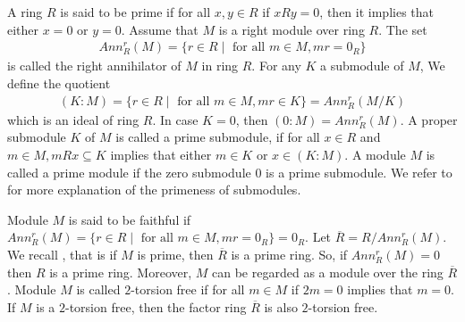 \documentclass{arxiv}
\begin{document}
A ring $R$ is said to be prime if for all $x,y \in R$ if $xRy=0$, then it implies that either $x=0$ or $y=0$. Assume that $M$ is a right module over ring $R$. The set 
\begin{align*}
    Ann_R^r(M)=\{r \in R \mid \text{ for all } m \in M, mr=0_R\}
\end{align*} 
is called the right annihilator of $M$ in ring $R$. For any $K$ a submodule of $M$, We define the quotient 
\begin{align*}
    (K:M)=\{ r \in R \mid \text{ for all } m \in M, mr \in K\} = Ann_R^r(M/K)
\end{align*}
which is an ideal of ring $R$. In case $K=0$, then $(0:M)=Ann_R^r(M)$. A proper submodule $K$ of $M$ is called a prime submodule, if for all $x \in R$ and $m \in M, mRx \subseteq K$ implies that either $m \in K$ or $x \in (K:M)$. A module $M$ is called a prime module if the zero submodule $0$ is a prime submodule. We refer to \cite{indah} for more explanation of the primeness of submodules.

Module $M$ is said to be faithful if $Ann_R^r (M) = \{ r \in R \mid \text{ for all } m \in M, mr = 0_R \} = 0_R$. Let $\overline{R}=R/Ann_R^r(M)$. We recall \cite[Proposition 2.2 (i)]{indah}, that is if $M$ is prime, then $\overline{R}$ is a prime ring. So, if $Ann_R^r(M)=0$ then $R$ is a prime ring. Moreover, $M$ can be regarded as a module over the ring $\overline{R}$. Module $M$ is called $2$-torsion free if for all $m \in M$ if $2m=0$ implies that $m=0$. If $M$ is a $2$-torsion free, then the factor ring $\overline{R}$ is also $2$-torsion free. 
\end{document}
